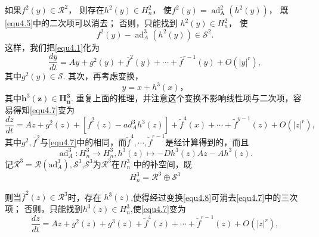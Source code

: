 如果$f ^ { 2 } ( y ) \in \mathscr { R } ^ { 2 }$，
则存在$h ^ { 2 } ( y ) \in H _ { n } ^ { 2 }$，
使$f ^ { 2 } ( y ) = \operatorname { ad } _ { \operatorname A } ^ { 2 } \left( h ^ { 2 } ( y ) \right)$，
既\ref{equ4.5}中的二次项可以消去；
否则，只能找到
$h^{2}(y) \in H_{n}^{2}$，
使
\begin{equation}
\label{eq:1.4.6}
f^{2}(y) - \operatorname { ad } _ { A } ^ { 3 } \left( h ^ { 2 } ( y ) \right) \in \mathscr{S}^2.
\end{equation}
这样，我们把\ref{equ4.1}化为
\begin{equation}
  \frac { d y } { d t } = A y + g ^ { 2 } ( y ) + \overline { f } ^ { 2 } ( y ) + \cdots + \overline { f } ^ { r - 1 } ( y ) + O \left( | y | ^ { r } \right),
  \label{eq:1.4.7}
\end{equation}
其中\(g^2(y) \in \mathscr{S}\).
其次，再考虑变换，
\begin{equation}
y = x + h ^ { 3 } ( x )，
\label{eq:1.4.8}
\end{equation}
其中$\mathbf { h } ^ { 3 } ( \mathbf { z } ) \in \boldsymbol { H } _ { \boldsymbol { n } } ^ { \mathbf { 3 } }$.
重复上面的推理，并注意这个变换不影响线性项与二次项，容易得知\ref{equ4.7}变为
\begin{equation}
  \frac { d z } { d t } = A z + g ^ { 2 } ( z ) +
  \left[ \overline { f } ^ { 2 } ( z ) - a d _ { A } ^ { 3 } h ^ { 3 } ( z ) \right] + \tilde { f } ^ { 4 } ( x ) +
  \cdots + \tilde { f } ^ { y - 1 } ( z ) + O ( | z |^ r ),
  \label{eq:1.4.9}
\end{equation}
其中\(g^2,\overline{f}^2\)与\ref{equ4.7}中的相同，而$\widetilde { f } ^ { 4 } , \cdots , \tilde { f } ^ { r - 1 }$是经计算得到的，而且
\[
\operatorname { ad } _ { A } ^ { 3 }:H _ { n } ^ { 3 } \rightarrow H _ { n } ^ { 3 },h ^ { 3 } ( z ) \mapsto - D h ^ { 3 } ( z ) A z - A h ^ { 3 } ( z ).
\]
记$\mathscr { R } ^ { 3 } = \mathscr { R } \left( \mathrm { ad } _ { A } ^ { 3 } \right) , \mathscr { S } ^ { 3 }$,\(\mathscr{S}^3\)为\(\mathscr{R}^3\)在\(H_n^3\) 中的补空间，既
\[
  H _ { n } ^ { 3 } = \mathscr { R } ^ { 3 } \oplus \mathscr S ^ { 3 }
\]

则当$\overline { f} ^ { 2 } ( z )  \in \mathscr { R } ^ { 3 }$时，存在
\(h^3(z)\),使得经过变换\ref{equ4.8}可消去\ref{equ4.7}中的三次项；
否则，只能找到$h ^ { 3 } ( z ) \in H _ { n } ^ { 3 }$,使\ref{equ4.7}变为
\[
\frac { d z } { d t } = A z + g ^ { 2 } ( z ) + g ^ { 3 } ( z ) + \tilde { f } ^ { 4 } ( z ) +\cdots + \tilde { f } ^ { r - 1 } ( z ) + O \left( | z | ^ { r } \right),
\]

